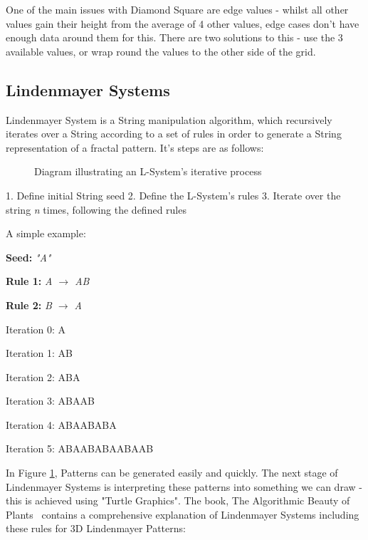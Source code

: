 \documentclass[a4paper,10pt]{report}
\begin{document}
One of the main issues with Diamond Square are edge values - whilst all other values gain their height from the average of 4 other values, edge cases don't have enough data around them for this. There are two solutions to this - use the 3 available values, or wrap round the values to the other side of the grid. 

\subsection{Lindenmayer Systems}

Lindenmayer System is a String manipulation algorithm, which recursively iterates over a String according to a set of rules in order to generate a String representation of a fractal pattern. It's steps are as follows:

\begin{figure}
\centering
 \caption{Diagram illustrating an L-System's iterative process}
 \label{fig:l_system_AB}
\end{figure}

1. Define initial String seed
2. Define the L-System's rules
3. Iterate over the string \textit{n} times, following the defined rules


A simple example:\medskip

\textbf{Seed:} \textit{"A"}

\textbf{Rule 1:} \textit{A $\rightarrow$ AB}

\textbf{Rule 2:} \textit{B $\rightarrow$ A}


Iteration 0: A

Iteration 1: AB

Iteration 2: ABA

Iteration 3: ABAAB

Iteration 4: ABAABABA

Iteration 5: ABAABABAABAAB\medskip



In Figure \ref{fig:l_system_AB}, Patterns can be generated easily and quickly. The next stage of Lindenmayer Systems is interpreting these patterns into something we can draw - this is achieved using "Turtle Graphics". The book, The Algorithmic Beauty of Plants~\cite{prusinkiewicz2012algorithmic} contains a comprehensive explanation of Lindenmayer Systems including these rules for 3D Lindenmayer Patterns:\medskip
\end{document}
